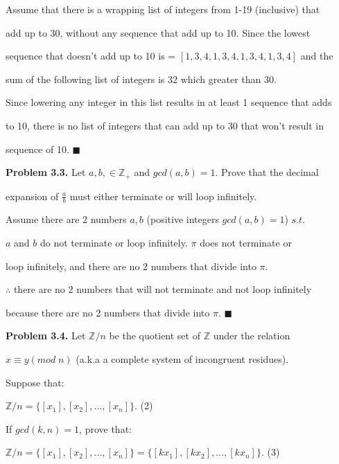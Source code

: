 \documentclass{article}
\begin{document}
Assume that there is a wrapping list of integers from 1-19 (inclusive) that

add up to 30, without any sequence that add up to 10. Since the lowest 

sequence that doesn't add up to 10 is = $[1,3,4,1,3,4,1,3,4,1,3,4]$ and the 

sum of the following list of integers is 32 which greater than 30. 

Since lowering any integer in this list results in at least 1 sequence that adds 

to 10, there is no list of integers that can add up to 30 that won't result in 

sequence of 10. $\blacksquare$

\vspace{0.5cm}

\textbf{Problem 3.3.} Let $a, b, \in \mathbb{Z}_+$ and $gcd(a,b) = 1$. Prove that the decimal 

expansion of $\frac{a}{b}$ must either terminate or will loop infinitely.

\vspace{0.25cm}

Assume there are 2 numbers $a, b$ (positive integers $gcd(a,b) = 1$) $s.t.$

$a$ and $b$ do not terminate or loop infinitely. $\pi$ does not terminate or 

loop infinitely, and there are no 2 numbers that divide into $\pi$.

$\therefore$ there are no 2 numbers that will not terminate and not loop infinitely 

because there are no 2 numbers that divide into $\pi$. $\blacksquare$


\vspace{0.5cm}

\textbf{Problem 3.4.} Let $\mathbb{Z}/n$ be the quotient set of $\mathbb{Z}$ under the relation 

$x \equiv y(mod\;n)$ (a.k.a a complete system of incongruent residues). 

Suppose that:

\begin{center}
	\hfill $\mathbb{Z}/n = \{[x_1],[x_2],...,[x_n]\}.$ \hfill (2)
\end{center}

If $gcd(k,n) = 1$, prove that:

\begin{center}
	\hfill $\mathbb{Z}/n = \{[x_1],[x_2],...,[x_n]\} = \{[kx_1],[kx_2],...,[kx_n]\}.$ \hfill (3)
\end{center}
\end{document}
